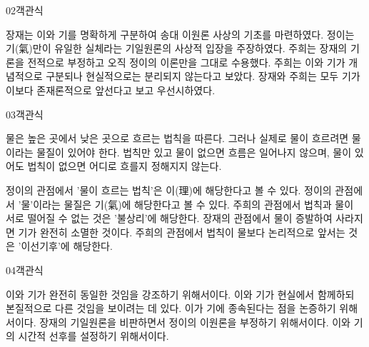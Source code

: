 \documentclass[fs85,seriesWit]{korfarm-base}
\begin{document}
\begin{kfQBlock}{02}{객관식}
\begin{kfChoices}
\kfChoice 장재는 이와 기를 명확하게 구분하여 송대 이원론 사상의 기초를 마련하였다.
\kfChoice 정이는 기(氣)만이 유일한 실체라는 기일원론의 사상적 입장을 주장하였다.
\kfChoice 주희는 장재의 기론을 전적으로 부정하고 오직 정이의 이론만을 그대로 수용했다.
\kfChoice 주희는 이와 기가 개념적으로 구분되나 현실적으로는 분리되지 않는다고 보았다.
\kfChoice 장재와 주희는 모두 기가 이보다 존재론적으로 앞선다고 보고 우선시하였다.
\end{kfChoices}
\end{kfQBlock}

\begin{kfQBlock}{03}{객관식}
\begin{kfEvidence}물은 높은 곳에서 낮은 곳으로 흐르는 법칙을 따른다. 그러나 실제로 물이 흐르려면 물이라는 물질이 있어야 한다. 법칙만 있고 물이 없으면 흐름은 일어나지 않으며, 물이 있어도 법칙이 없으면 어디로 흐를지 정해지지 않는다.\end{kfEvidence}
\begin{kfChoices}
\kfChoice 정이의 관점에서 '물이 흐르는 법칙'은 이(理)에 해당한다고 볼 수 있다.
\kfChoice 정이의 관점에서 '물'이라는 물질은 기(氣)에 해당한다고 볼 수 있다.
\kfChoice 주희의 관점에서 법칙과 물이 서로 떨어질 수 없는 것은 '불상리'에 해당한다.
\kfChoice 장재의 관점에서 물이 증발하여 사라지면 기가 완전히 소멸한 것이다.
\kfChoice 주희의 관점에서 법칙이 물보다 논리적으로 앞서는 것은 '이선기후'에 해당한다.
\end{kfChoices}
\end{kfQBlock}

\begin{kfQBlock}{04}{객관식}
\begin{kfChoices}
\kfChoice 이와 기가 완전히 동일한 것임을 강조하기 위해서이다.
\kfChoice 이와 기가 현실에서 함께하되 본질적으로 다른 것임을 보이려는 데 있다.
\kfChoice 이가 기에 종속된다는 점을 논증하기 위해서이다.
\kfChoice 장재의 기일원론을 비판하면서 정이의 이원론을 부정하기 위해서이다.
\kfChoice 이와 기의 시간적 선후를 설정하기 위해서이다.
\end{kfChoices}
\end{kfQBlock}

\kfEndMC
\end{document}
